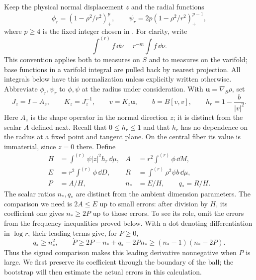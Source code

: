 Keep the physical normal displacement $z$ and the radial functions
\[
 \phi_r=(1-\rho^2/r^2)_+^p,
 \qquad \psi_r=2p(1-\rho^2/r^2)_+^{p-1},
\]
where $p\geq4$ is the fixed integer chosen in .
For clarity, write
\[
 \int^{(r)} f\,\dd\nu=r^{-m}\int f\,\dd\nu.
\]
This convention applies both to measures on $S$ and to measures on the
varifold; base functions in a varifold integral are pulled back by nearest
projection.  All integrals below have this normalization unless explicitly
written otherwise.  Abbreviate $\phi_r,\psi_r$ to $\phi,\psi$ at the radius
under consideration.  With $\mathbf u=\nabla_S\rho$, set
\[
 J_z=I-A_z,\qquad K_z=J_z^{-1},\qquad v=K_z\mathbf u,
 \qquad b=B[v,v],\qquad h_r=1-\frac{b}{|v|^2}.
\]
Here $A_z$ is the shape operator in the normal direction $z$; it is
distinct from the scalar $A$ defined next.  Recall that $0\leq h_r\leq1$
and that $h_r$ has no dependence on the radius at a fixed point and tangent
plane.  On the central fiber its value is immaterial, since $z=0$ there.
Define
\begin{equation}\label{in:variables}
 \begin{aligned}
 H&=\int^{(r)}\psi |z|^2h_r\,\dd\mu,
 &A&=r^2\int^{(r)}\phi\,\dd M,\\
 E&=r^2\int^{(r)}\phi\,\dd D,
 &R&=\int^{(r)}\rho^2\psi b\,\dd\mu,\\
 P&=A/H,& n_*&=E/H,\qquad q_*=R/H.
 \end{aligned}
\end{equation}
The scalar ratios $n_*,q_*$ are distinct from the ambient dimension
parameters.  The comparison we need is $2A\leq E$ up to small errors:
after division by $H$, its coefficient one gives $n_*\geq2P$ up to
those errors.  To see its role, omit the errors from the frequency
inequalities proved below.  With a dot denoting differentiation in
$\log r$, their leading terms give, for $P\geq0$,
\[
 q_*\geq n_*^2,\qquad
 \dot P\geq2P-n_*+q_*-2Pn_*
       \geq(n_*-1)(n_*-2P).
\]
Thus the signed comparison makes this leading derivative nonnegative
when $P$ is large.  We first preserve its coefficient through the
boundary of the ball; the bootstrap will then estimate the actual
errors in this calculation.

